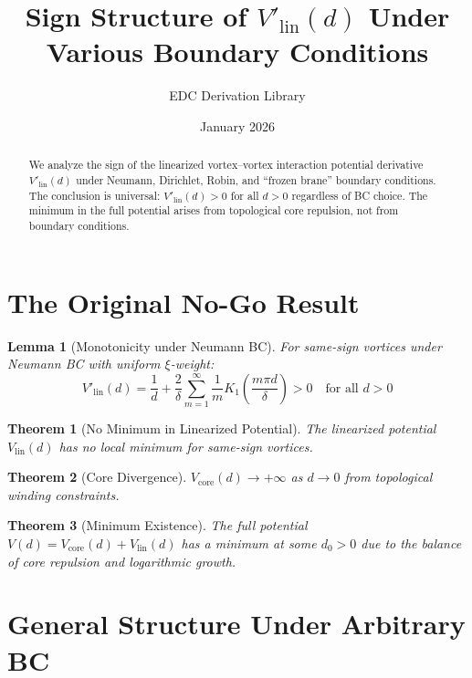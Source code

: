 \documentclass[11pt,a4paper]{article}
\title{Sign Structure of $V'_{\mathrm{lin}}(d)$ Under Various Boundary Conditions}
\author{EDC Derivation Library}
\date{January 2026}
\newtheorem{theorem}{Theorem}
\newtheorem{lemma}{Lemma}
\begin{document}
\maketitle

\begin{abstract}
We analyze the sign of the linearized vortex--vortex interaction potential derivative
$V'_{\mathrm{lin}}(d)$ under Neumann, Dirichlet, Robin, and ``frozen brane'' boundary
conditions. The conclusion is universal: $V'_{\mathrm{lin}}(d) > 0$ for all $d > 0$
regardless of BC choice. The minimum in the full potential arises from topological
core repulsion, not from boundary conditions.
\end{abstract}

\section{The Original No-Go Result}

\begin{lemma}[Monotonicity under Neumann BC]
For same-sign vortices under Neumann BC with uniform $\xi$-weight:
\begin{equation}
V'_{\mathrm{lin}}(d) = \frac{1}{d} + \frac{2}{\delta} \sum_{m=1}^{\infty}
\frac{1}{m} K_1\!\left(\frac{m\pi d}{\delta}\right) > 0
\quad \text{for all } d > 0
\end{equation}
\end{lemma}

\begin{theorem}[No Minimum in Linearized Potential]
The linearized potential $V_{\mathrm{lin}}(d)$ has no local minimum for same-sign vortices.
\end{theorem}

\begin{theorem}[Core Divergence]
$V_{\mathrm{core}}(d) \to +\infty$ as $d \to 0$ from topological winding constraints.
\end{theorem}

\begin{theorem}[Minimum Existence]
The full potential $V(d) = V_{\mathrm{core}}(d) + V_{\mathrm{lin}}(d)$ has a minimum
at some $d_0 > 0$ due to the balance of core repulsion and logarithmic growth.
\end{theorem}

\section{General Structure Under Arbitrary BC}
\end{document}
